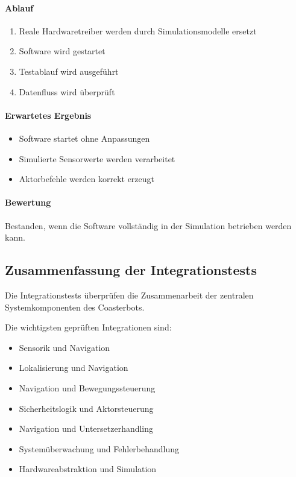 \paragraph{Ablauf}\label{ablauf-15}

\begin{enumerate}
\def\labelenumi{\arabic{enumi}.}
\tightlist
\item
  Reale Hardwaretreiber werden durch Simulationsmodelle ersetzt
\item
  Software wird gestartet
\item
  Testablauf wird ausgeführt
\item
  Datenfluss wird überprüft
\end{enumerate}

\paragraph{Erwartetes Ergebnis}\label{erwartetes-ergebnis-15}

\begin{itemize}
\tightlist
\item
  Software startet ohne Anpassungen
\item
  Simulierte Sensorwerte werden verarbeitet
\item
  Aktorbefehle werden korrekt erzeugt
\end{itemize}

\paragraph{Bewertung}\label{bewertung-15}

Bestanden, wenn die Software vollständig in der Simulation betrieben
werden kann.

\subsection{Zusammenfassung der
Integrationstests}\label{zusammenfassung-der-integrationstests}

Die Integrationstests überprüfen die Zusammenarbeit der zentralen
Systemkomponenten des Coasterbots.

Die wichtigsten geprüften Integrationen sind:

\begin{itemize}
\tightlist
\item
  Sensorik und Navigation
\item
  Lokalisierung und Navigation
\item
  Navigation und Bewegungssteuerung
\item
  Sicherheitslogik und Aktorsteuerung
\item
  Navigation und Untersetzerhandling
\item
  Systemüberwachung und Fehlerbehandlung
\item
  Hardwareabstraktion und Simulation
\end{itemize}

